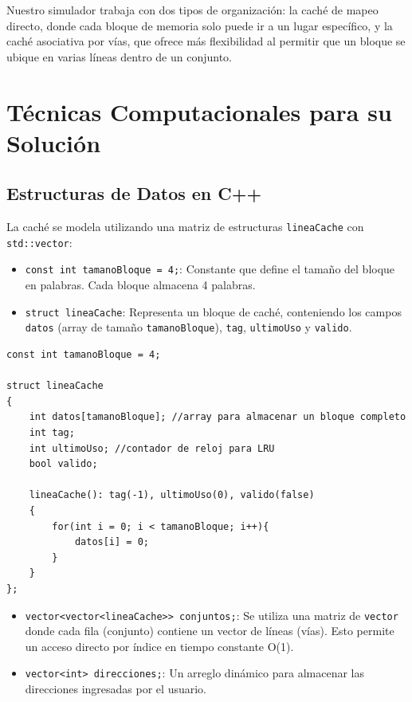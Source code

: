 \documentclass[14pt]{article}
\begin{document}
Nuestro simulador trabaja con dos tipos de organización: la caché de mapeo directo, donde cada bloque de memoria solo puede ir a un lugar específico, y la caché asociativa por vías, que ofrece más flexibilidad al permitir que un bloque se ubique en varias líneas dentro de un conjunto.

\section*{Técnicas Computacionales para su Solución}

\subsection*{Estructuras de Datos en C++}

La caché se modela utilizando una matriz de estructuras \texttt{lineaCache} con \texttt{std::vector}:

\begin{itemize}
    \item \texttt{const int tamanoBloque = 4;}: Constante que define el tamaño del bloque en palabras. Cada bloque almacena 4 palabras.
    \item \texttt{struct lineaCache}: Representa un bloque de caché, conteniendo los campos \texttt{datos} (array de tamaño \texttt{tamanoBloque}), \texttt{tag}, \texttt{ultimoUso} y \texttt{valido}.
\end{itemize}

\begin{lstlisting}
const int tamanoBloque = 4;

struct lineaCache
{
    int datos[tamanoBloque]; //array para almacenar un bloque completo
    int tag;
    int ultimoUso; //contador de reloj para LRU
    bool valido;

    lineaCache(): tag(-1), ultimoUso(0), valido(false)
    {
        for(int i = 0; i < tamanoBloque; i++){
            datos[i] = 0;
        }
    }
};
\end{lstlisting}

\begin{itemize}
    \item \texttt{vector<vector<lineaCache>> conjuntos;}: Se utiliza una matriz de \texttt{vector} donde cada fila (conjunto) contiene un vector de líneas (vías). Esto permite un acceso directo por índice en tiempo constante O(1).
    \item \texttt{vector<int> direcciones;}: Un arreglo dinámico para almacenar las direcciones ingresadas por el usuario.
\end{itemize}
\end{document}
